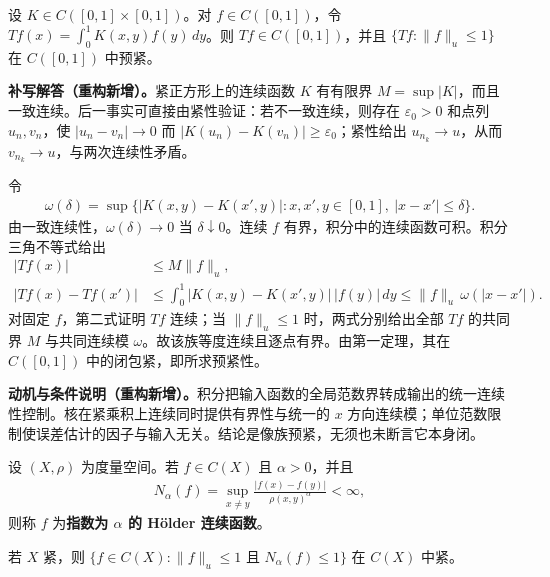 \documentclass[../../main.tex]{subfiles}%
\begin{document}
\begin{exercise}\label{exercise:ch04-continuous-kernel}
设 $K\in C([0,1]\times[0,1])$。对 $f\in C([0,1])$，令 $Tf(x)=\int_0^1K(x,y)f(y)\,dy$。则 $Tf\in C([0,1])$，并且 $\{Tf:\|f\|_u\le1\}$ 在 $C([0,1])$ 中预紧。
\end{exercise}
\begin{solution}
\textbf{补写解答（重构新增）。}紧正方形上的连续函数 $K$ 有有限界 $M=\sup|K|$，而且一致连续。后一事实可直接由紧性验证：若不一致连续，则存在 $\varepsilon_0>0$ 和点列 $u_n,v_n$，使 $|u_n-v_n|\to0$ 而 $|K(u_n)-K(v_n)|\ge\varepsilon_0$；紧性给出 $u_{n_k}\to u$，从而 $v_{n_k}\to u$，与两次连续性矛盾。

令
\begin{align*}
\omega(\delta)=\sup\{|K(x,y)-K(x',y)|:x,x',y\in[0,1],\ |x-x'|\le\delta\}.
\end{align*}
由一致连续性，$\omega(\delta)\to0$ 当 $\delta\downarrow0$。连续 $f$ 有界，积分中的连续函数可积。积分三角不等式给出
\begin{align*}
|Tf(x)|&\le M\|f\|_u,\\
|Tf(x)-Tf(x')|&\le\int_0^1|K(x,y)-K(x',y)|\,|f(y)|\,dy
\le\|f\|_u\,\omega(|x-x'|).
\end{align*}
对固定 $f$，第二式证明 $Tf$ 连续；当 $\|f\|_u\le1$ 时，两式分别给出全部 $Tf$ 的共同界 $M$ 与共同连续模 $\omega$。故该族等度连续且逐点有界。由第一定理，其在 $C([0,1])$ 中的闭包紧，即所求预紧性。
\end{solution}
\begin{remark}
\textbf{动机与条件说明（重构新增）。}积分把输入函数的全局范数界转成输出的统一连续性控制。核在紧乘积上连续同时提供有界性与统一的 $x$ 方向连续模；单位范数限制使误差估计的因子与输入无关。结论是像族预紧，无须也未断言它本身闭。
\end{remark}
\begin{exercise}\label{exercise:ch04-holder-family}
\begin{definition*}[H\"older 连续]\label{definition:ch04-holder-continuity}
设 $(X,\rho)$ 为度量空间。若 $f\in C(X)$ 且 $\alpha>0$，并且
\begin{align*}
N_\alpha(f)=\sup_{x\ne y}\frac{|f(x)-f(y)|}{\rho(x,y)^\alpha}<\infty,
\end{align*}
则称 $f$ 为\textbf{指数为 $\alpha$ 的 H\"older 连续函数}。
\end{definition*}
若 $X$ 紧，则 $\{f\in C(X):\|f\|_u\le1\text{ 且 }N_\alpha(f)\le1\}$ 在 $C(X)$ 中紧。
\end{exercise}
\end{document}
